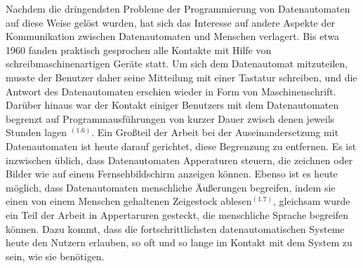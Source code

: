 {Nachdem die dringendsten Probleme der Programmierung von Datenautomaten auf diese Weise gelöst wurden, hat sich das Interesse auf andere Aspekte der Kommunikation zwischen Datenautomaten und Menschen verlagert. Bis etwa 1960 fanden praktisch gesprochen alle Kontakte mit Hilfe von schreibmaschinenartigen Geräte statt. Um sich dem Datenautomat mitzuteilen, musste der Benutzer daher seine Mitteilung mit einer Tastatur schreiben, und die Antwort des Datenautomaten erschien wieder in Form von Maschinenschrift.
Darüber hinaus war der Kontakt einiger Benutzers mit dem Datenautomaten begrenzt auf Programmausführungen von kurzer Dauer zwisch denen jeweils Stunden lagen $^{(1.6)}$. Ein Großteil der Arbeit bei der Auseinandersetzung mit Datenautomaten ist heute darauf gerichtet, diese Begrenzung zu entfernen. Es ist inzwischen üblich, dass Datenautomaten Apperaturen steuern, die zeichnen oder Bilder wie auf einem Fernsehbildschirm anzeigen können. Ebenso ist es heute möglich, dass Datenautomaten menschliche Äußerungen begreifen, indem sie einen von einem Menschen gehaltenen Zeigestock ablesen$^{(1.7)}$, gleichsam wurde ein Teil der Arbeit in Appertaruren gesteckt, die menschliche Sprache begreifen können.
Dazu kommt, dass die fortschrittlichsten datenautomatischen Systeme heute den Nutzern erlauben, so oft und so lange im Kontakt mit dem System zu sein, wie sie benötigen.
}


